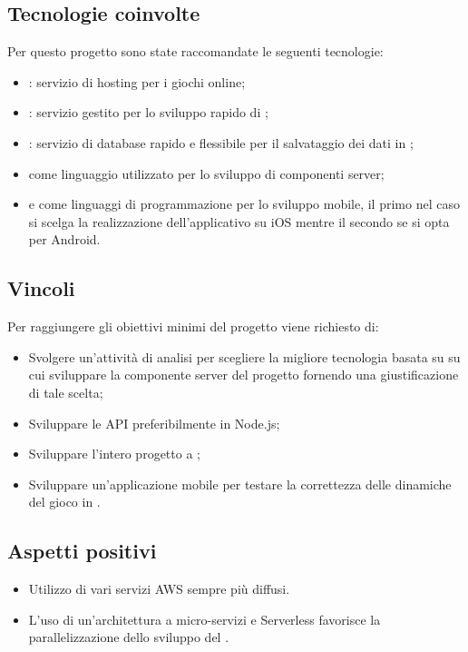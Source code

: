 \subsection{Tecnologie coinvolte}
Per questo progetto sono state raccomandate le seguenti tecnologie:
\begin{itemize}
	\item {}: servizio di hosting per i giochi online;
	\item {}: servizio gestito per lo sviluppo rapido di ;
	\item {}: servizio di database  rapido e flessibile per il salvataggio dei dati in ;
	\item {} come linguaggio utilizzato per lo sviluppo di componenti server;
	\item {} e  come linguaggi di programmazione per lo sviluppo mobile, il primo nel caso si scelga la realizzazione dell'applicativo su iOS mentre il secondo se si opta per Android.
\end{itemize}

\subsection{Vincoli}
Per raggiungere gli obiettivi minimi del progetto viene richiesto di:
\begin{itemize}
	\item Svolgere un'attività di analisi per scegliere la migliore tecnologia basata su  su cui sviluppare la componente server del progetto fornendo una giustificazione di tale scelta;
	\item Sviluppare le API preferibilmente in Node.js;
	\item Sviluppare l'intero progetto a ;
	\item Sviluppare un'applicazione mobile per testare la correttezza delle dinamiche del gioco in .
\end{itemize}

 \subsection{Aspetti positivi}
\begin{itemize}
	\item Utilizzo di vari servizi AWS sempre più diffusi.
	\item L'uso di un'architettura a micro-servizi e Serverless favorisce la parallelizzazione dello sviluppo del .
\end{itemize}


